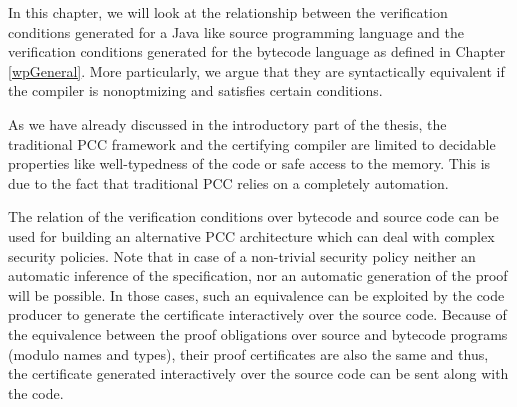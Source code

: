 

In this chapter, we will look at the relationship between
the verification conditions generated for a Java like source programming 
language and the verification conditions generated for the bytecode language 
as defined in Chapter \ref{wpGeneral}. More particularly, we 
argue that they are syntactically equivalent if the compiler is nonoptmizing and satisfies certain 
conditions.
 

As we have already discussed in the introductory part of the thesis, the traditional PCC framework 
and the certifying compiler are limited to decidable properties like well-typedness of the code
or safe access to the memory. This is due to the fact that traditional PCC relies on a completely automation.




The relation of the verification conditions over bytecode and source code can be used for building an
 alternative PCC architecture which can deal with complex security policies. Note that in case of a non-trivial 
security policy neither an automatic inference of the specification, nor an automatic generation 
of the proof will be possible.
In those cases, such an equivalence can be exploited by the code producer to generate
 the certificate interactively over the source code. Because of the
equivalence between the proof obligations over source and bytecode programs (modulo names and types), 
their  proof certificates are also the same and thus, the certificate generated interactively over the
 source code can be sent along with the code.   


